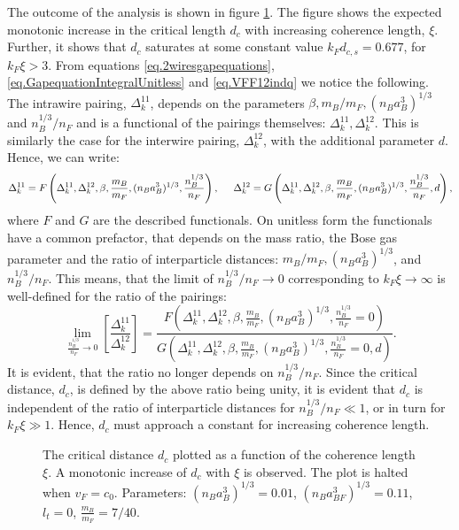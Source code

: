 The outcome of the analysis is shown in figure \ref{fig.twowirescrossoverxidepend}. The figure shows the expected monotonic increase in the critical length $d_c$ with increasing coherence length, $\xi$. Further, it shows that $d_c$ saturates at some constant value $k_Fd_{c,s} = 0.677$, for $k_F\xi > 3$. From equations \ref{eq.2wiresgapequations}, \ref{eq.GapequationIntegralUnitless} and \ref{eq.VFF12indq} we notice the following. The intrawire pairing, $\Delta^{11}_k$, depends on the parameters $\beta, m_B/m_F, (n_Ba_B^3)^{1/3}$ and $n_B^{1/3}/n_F$ and is a functional of the pairings themselves: $\Delta^{11}_k, \Delta^{12}_k$. This is similarly the case for the interwire pairing, $\Delta^{12}_k$, with the additional parameter $d$. Hence, we can write:
\begin{equation}
\Delta^{11}_k = F\left(\Delta^{11}_k, \Delta^{12}_k, \beta, \frac{m_B}{m_F}, (n_Ba_B^3)^{1/3}, \frac{n_B^{1/3}}{n_F} \right), \hspace{0.5cm} \Delta^{12}_k = G\left(\Delta^{11}_k, \Delta^{12}_k, \beta, \frac{m_B}{m_F}, (n_Ba_B^3)^{1/3}, \frac{n_B^{1/3}}{n_F}, d \right), \nonumber 
\end{equation}
where $F$ and $G$ are the described functionals. On unitless form the functionals have a common prefactor, that depends on the mass ratio, the Bose gas parameter and the ratio of interparticle distances: $m_B/m_F, (n_Ba_B^3)^{1/3}$, and $n_B^{1/3}/n_F$. This means, that the limit of $n_B^{1/3}/n_F \to 0 $ corresponding to $k_F\xi \to \infty$ is well-defined for the ratio of the pairings:
\begin{equation}
\lim_{\frac{n_B^{1/3}}{n_F} \to 0} \left[\frac{\Delta^{11}_k}{\Delta^{12}_k}\right] = \frac{F\left(\Delta^{11}_k, \Delta^{12}_k, \beta, \frac{m_B}{m_F}, (n_Ba_B^3)^{1/3}, \frac{n_B^{1/3}}{n_F} = 0 \right) }{G\left(\Delta^{11}_k, \Delta^{12}_k, \beta, \frac{m_B}{m_F}, (n_Ba_B^3)^{1/3}, \frac{n_B^{1/3}}{n_F} = 0, d \right)}. \nonumber
\end{equation}
It is evident, that the ratio no longer depends on $n_B^{1/3}/n_F$. Since the critical distance, $d_c$, is defined by the above ratio being unity, it is evident that $d_c$ is independent of the ratio of interparticle distances for $n_B^{1/3}/n_F \ll 1$, or in turn for $k_F\xi \gg 1$. Hence, $d_c$ must approach a constant for increasing coherence length.  

\begin{figure} 
\begin{center}  
  
\caption{The critical distance $d_c$ plotted as a function of the coherence length $\xi$. A monotonic increase of $d_c$ with $\xi$ is observed. The plot is halted when $v_F = c_0$. Parameters: $(n_Ba_B^3)^{1/3} = 0.01$, $(n_Ba_{BF}^3)^{1/3} = 0.11$, $l_t = 0$, $\frac{m_B}{m_F} = 7/40$. }  
\label{fig.twowirescrossoverxidepend}  
\end{center}    
\end{figure}

